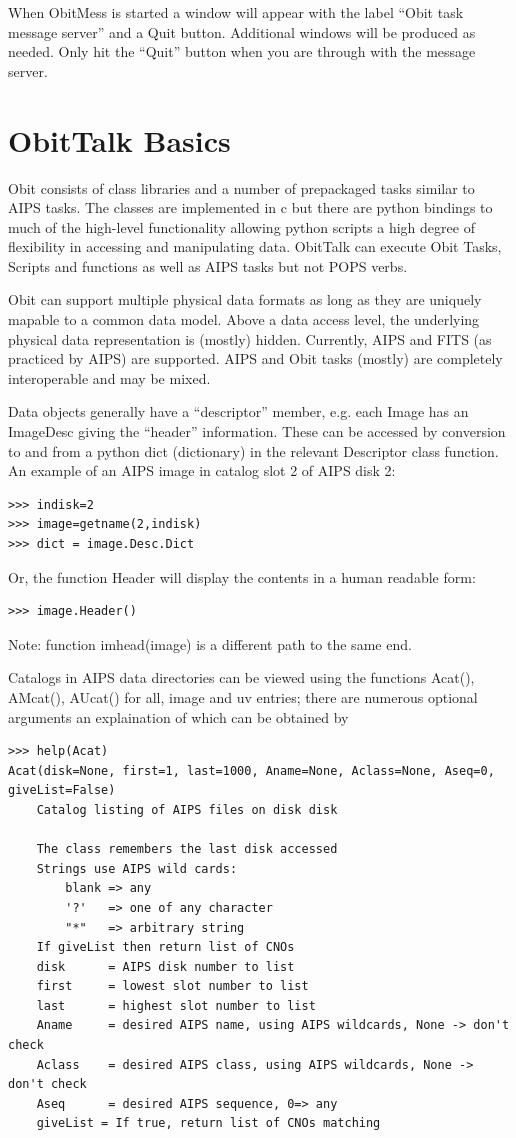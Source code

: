 \documentclass[11pt]{report}
\begin{document}
When ObitMess is started a window will appear with the label ``Obit
task message server'' and a Quit button.
Additional windows will be produced as needed.
Only hit the ``Quit'' button when you are through with the message server.

\section {ObitTalk Basics}
   Obit consists of class libraries and a number of prepackaged
tasks similar to AIPS tasks.  The classes are implemented in c but
there are python bindings to much of the high-level functionality
allowing python scripts a high degree of flexibility in accessing
and manipulating data.
ObitTalk can execute Obit Tasks, Scripts and functions as well as AIPS
tasks but not POPS verbs.

   Obit can support multiple physical data formats as long as they are
uniquely mapable to a common data model.  Above a data access level,
the underlying physical data representation is (mostly) hidden.
Currently, AIPS and FITS (as practiced by AIPS) are supported.
AIPS and Obit tasks (mostly) are completely interoperable and may be
mixed.

   Data objects generally have a ``descriptor'' member, e.g. each
Image has an ImageDesc giving the ``header'' information.
These can be accessed by conversion to and from a python dict
(dictionary) in the relevant Descriptor class function.
An example of an AIPS image in catalog slot 2 of AIPS disk 2:
\begin{verbatim}
>>> indisk=2
>>> image=getname(2,indisk)
>>> dict = image.Desc.Dict
\end{verbatim}
Or, the function Header will display the contents in a human readable
form:
\begin{verbatim}
>>> image.Header()
\end{verbatim}
Note: function imhead(image) is a different path to the same end.

Catalogs in AIPS data directories can be viewed using the functions
Acat(), AMcat(), AUcat() for all, image and uv entries; there are
numerous optional arguments an explaination of which can be obtained
by
\begin{verbatim}
>>> help(Acat)
Acat(disk=None, first=1, last=1000, Aname=None, Aclass=None, Aseq=0, giveList=False)
    Catalog listing of AIPS files on disk disk
    
    The class remembers the last disk accessed
    Strings use AIPS wild cards:
        blank => any
        '?'   => one of any character
        "*"   => arbitrary string
    If giveList then return list of CNOs
    disk      = AIPS disk number to list
    first     = lowest slot number to list
    last      = highest slot number to list
    Aname     = desired AIPS name, using AIPS wildcards, None -> don't check
    Aclass    = desired AIPS class, using AIPS wildcards, None -> don't check
    Aseq      = desired AIPS sequence, 0=> any
    giveList = If true, return list of CNOs matching
\end{verbatim}
\end{document}
